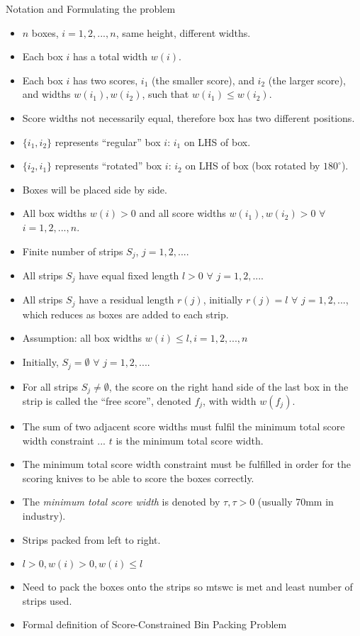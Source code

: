 \documentclass[oribibl]{llncs}
\begin{document}
Notation and Formulating the problem
\begin{itemize}
	\item $n$ boxes, $i = 1, 2, ..., n$, same height, different widths.
	\item Each box $i$ has a total width $w(i)$.
	\item Each box $i$ has two scores, $i_1$ (the smaller score), and $i_2$ (the larger score), and widths $w(i_1), w(i_2)$, such that $w(i_1) \leq w(i_2)$.
	\item Score widths not necessarily equal, therefore box has two different positions.
	\item $\{i_1, i_2\}$ represents ``regular'' box $i$: $i_1$ on LHS of box.
	\item $\{i_2, i_1\}$ represents ``rotated'' box $i$: $i_2$ on LHS of box (box rotated by $180^{\circ}$).
	\item Boxes will be placed side by side.
	\item All box widths $w(i) > 0$ and all score widths $w(i_1), w(i_2) > 0$ $\forall$ $i = 1, 2, ..., n$.
	\item Finite number of strips $S_j$, $j = 1, 2, ...$.
	\item All strips $S_j$ have equal fixed length $l > 0$ $\forall$ $j = 1, 2, ...$.
	\item All strips $S_j$ have a residual length $r(j)$, initially $r(j) = l$ $\forall$ $j = 1,2, ...$, which reduces as boxes are added to each strip.
	\item Assumption: all box widths $w(i) \leq l, i = 1, 2, ..., n$
	\item Initially, $S_j = \emptyset$ $\forall$ $j = 1, 2, ...$.
	\item For all strips $S_j \neq \emptyset$, the score on the right hand side of the last box in the strip is called the ``free score'', denoted $f_j$, with width $w(f_j)$.
	\item The sum of two adjacent score widths must fulfil the minimum total score width constraint ... $t$ is the minimum total score width.
	\item The minimum total score width constraint must be fulfilled in order for the scoring knives to be able to score the boxes correctly.
	\item The \textit{minimum total score width} is denoted by $\tau, \tau > 0$ (usually 70mm in industry).
	\item Strips packed from left to right.
	\item $l > 0, w(i) > 0, w(i) \leq l$
	\item Need to pack the boxes onto the strips so mtswc is met and least number of strips used.
	\item Formal definition of Score-Constrained Bin Packing Problem
\end{itemize}
\end{document}
